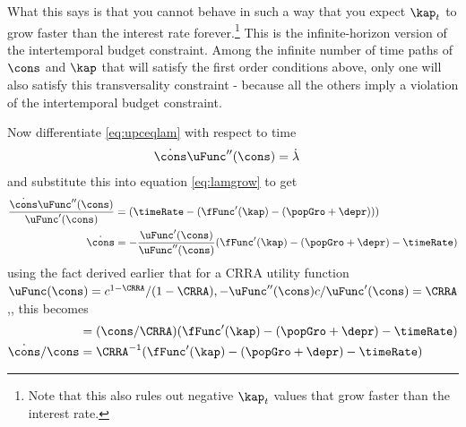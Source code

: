 \documentclass{handout}
\begin{document}
What this says is that you cannot behave in such a way that you expect
$\kap_{t}$ to grow faster than the interest rate
forever.\footnote{Note that this also rules out negative $\kap_{t}$
  values that grow faster than the interest rate.}  This is the
infinite-horizon version of the intertemporal budget constraint.
Among the infinite number of time paths of $\cons$ and $\kap$ that
will satisfy the first order conditions above, only one will also
satisfy this transversality constraint - because all the others imply
a violation of the intertemporal budget constraint.


Now differentiate \eqref{eq:upceqlam} with respect to time
\begin{equation}\begin{gathered}\begin{aligned}
        \dot{\cons} \uFunc^{\prime\prime}(\cons) & =  \dot{\lambda}
\end{aligned}\end{gathered}\end{equation}
and substitute this into equation \eqref{eq:lamgrow} to get
\begin{equation}\begin{gathered}\begin{aligned}
        \frac{\dot{\cons} \uFunc^{\prime\prime}(\cons)}{\uFunc^{\prime}(\cons)} & =  (\timeRate-(\fFunc^{\prime}(\kap)-(\popGro+\depr)))  \\
        \dot{\cons} & =  -\frac{\uFunc^{\prime}(\cons)}{\uFunc^{\prime\prime}(\cons)} (\fFunc^{\prime}(\kap)-(\popGro+\depr)-\timeRate) \label{eq:trans1}
      \end{aligned}\end{gathered}\end{equation}
  using the fact 
derived earlier that for a CRRA utility function 
$\uFunc(\cons)=c^{1-\CRRA}/(1-\CRRA), -\uFunc^{\prime\prime}(\cons) c/\uFunc^{\prime}(\cons) = \CRRA$,, this becomes
\begin{equation}\begin{gathered}\begin{aligned}
         & =  (\cons/\CRRA) (\fFunc^{\prime}(\kap)-(\popGro+\depr)-\timeRate) \label{eq:trans2}
\\  \dot{\cons}/\cons & =  \CRRA^{-1}(\fFunc^{\prime}(\kap)-(\popGro+\depr)-\timeRate)
\end{aligned}\end{gathered}\end{equation}

\medskip
\end{document}
